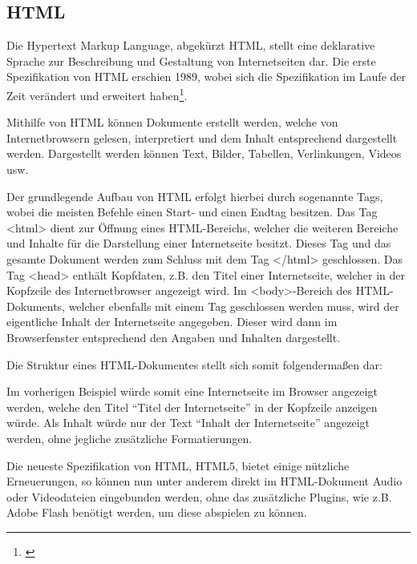 \subsection{HTML}
\label{sec:Html}

Die Hypertext Markup Language, abgekürzt HTML, stellt eine deklarative Sprache zur Beschreibung und Gestaltung von Internetseiten dar. Die erste Spezifikation von HTML erschien 1989, wobei sich die Spezifikation im Laufe der Zeit verändert und erweitert haben\footnote{\citet{taglinger2003}}.

Mithilfe von HTML können Dokumente erstellt werden, welche von Internetbrowsern gelesen, interpretiert und dem Inhalt entsprechend dargestellt werden. Dargestellt werden können Text, Bilder, Tabellen, Verlinkungen, Videos usw.

Der grundlegende Aufbau von HTML erfolgt hierbei durch sogenannte Tags, wobei die meisten Befehle einen Start- und einen Endtag besitzen.
Das Tag <html> dient zur Öffnung eines HTML-Bereichs, welcher die weiteren Bereiche und Inhalte für die Darstellung einer Internetseite besitzt. Dieses Tag und das gesamte Dokument werden zum Schluss mit dem Tag </html> geschlossen. Das Tag <head> enthält Kopfdaten, z.B. den Titel einer Internetseite, welcher in der Kopfzeile des Internetbrowser angezeigt wird. Im <body>-Bereich des HTML-Dokuments, welcher ebenfalls mit einem Tag geschlossen werden muss, wird der eigentliche Inhalt der Internetseite angegeben. Dieser wird dann im Browserfenster entsprechend den Angaben und Inhalten dargestellt.

Die Struktur eines HTML-Dokumentes stellt sich somit folgendermaßen dar:



Im vorherigen Beispiel würde somit eine Internetseite im Browser angezeigt werden, welche den Titel "`Titel der Internetseite"' in der Kopfzeile anzeigen würde. Als Inhalt würde nur der Text "`Inhalt der Internetseite"' angezeigt werden, ohne jegliche zusätzliche Formatierungen.

Die neueste Spezifikation von HTML, HTML5, bietet einige nützliche Erneuerungen, so können nun unter anderem direkt im HTML-Dokument Audio oder Videodateien eingebunden werden, ohne das zusätzliche Plugins, wie z.B. Adobe Flash benötigt werden, um diese abspielen zu können.